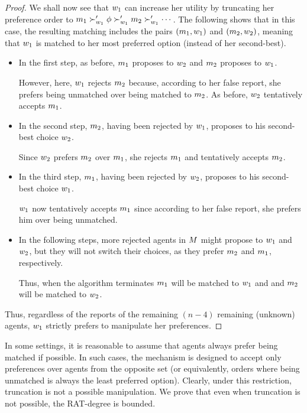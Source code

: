 \begin{proof}
We shall now see that $w_1$ can increase her utility by truncating her preference order to $m_1 \succ'_{w_1} \phi \succ'_{w_1} m_2 \succ'_{w_1} \cdots $.
The following shows that in this case, the resulting matching includes the pairs $(m_1, w_1)$ and $(m_2, w_2)$, meaning that $w_1$ is matched to her most preferred option (instead of her second-best).
\begin{itemize}
\item In the first step, as before, $m_1$ proposes to $w_2$ and $m_2$ proposes to $w_1$.

However, here,  $w_1$ rejects $m_2$ because, according to her false report, she prefers being unmatched over being matched to $m_2$.
As before, $w_2$ tentatively accepts $m_1$.


\item In the second step, $m_2$, having been rejected by $w_1$, proposes to his second-best choice $w_2$.

Since $w_2$ prefers $m_2$ over $m_1$,  she rejects $m_1$ and tentatively accepts $m_2$.


\item In the third step, $m_1$, having been rejected by  $w_2$, proposes to his second-best choice $w_1$.

$w_1$ now tentatively accepts $m_1$ since according to her false report, she prefers him over being unmatched.


\item In the following steps, more rejected agents in $M$ might propose to $w_1$ and $w_2$, but they will not switch their choices, as they prefer $m_2$ and $m_1$, respectively. 

Thus, when the algorithm terminates $m_1$ will be matched to $w_1$ and and $m_2$ will be matched to $w_2$. 
\end{itemize}

Thus, regardless of the reports of the remaining $(n-4)$ remaining (unknown) agents, $w_1$ strictly prefers to manipulate her preferences.
\end{proof}

In some settings, it is reasonable to assume that agents always prefer being matched if possible. In such cases, the mechanism is designed to accept only preferences over agents from the opposite set (or equivalently, orders where being unmatched is always the least preferred option). Clearly, under this restriction, truncation is not a possible manipulation.
We prove that even when truncation is not possible, the RAT-degree is bounded.

